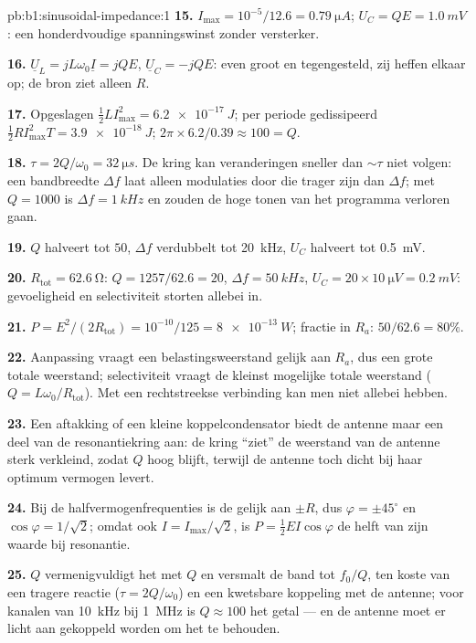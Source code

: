 \begin{solution}{pb:b1:sinusoidal-impedance:1}
\textbf{15.} $I_{\max} = 10^{-5}/12.6 = \qty{0.79}{\micro A}$; $U_C = QE =
\qty{1.0}{mV}$: een honderdvoudige spanningswinst zonder versterker.

\textbf{16.} $\underline U_L = jL\omega_0\underline I = jQE$, $\underline U_C
= -jQE$: even groot en tegengesteld, zij heffen elkaar op; de bron ziet alleen $R$.

\textbf{17.} Opgeslagen $\tfrac12 LI_{\max}^2 = \qty{6.2e-17}{J}$; per periode
gedissipeerd $\tfrac12 RI_{\max}^2T = \qty{3.9e-18}{J}$; $2\pi \times 6.2/0.39
\approx 100 = Q$.

\textbf{18.} $\tau = 2Q/\omega_0 = \qty{32}{\micro s}$. De kring kan
veranderingen sneller dan $\sim\tau$ niet volgen: een bandbreedte $\Delta f$ laat
alleen modulaties door die trager zijn dan $\Delta f$; met $Q = 1000$ is $\Delta f =
\qty{1}{kHz}$ en zouden de hoge tonen van het programma verloren gaan.

\textbf{19.} $Q$ halveert tot $50$, $\Delta f$ verdubbelt tot \qty{20}{kHz}, $U_C$
halveert tot \qty{0.5}{mV}.

\textbf{20.} $R_{\text{tot}} = \qty{62.6}{\ohm}$: $Q = 1257/62.6 = 20$,
$\Delta f = \qty{50}{kHz}$, $U_C = 20 \times \qty{10}{\micro V} = \qty{0.2}{mV}$:
gevoeligheid en selectiviteit storten allebei in.

\textbf{21.} $P = E^2/(2R_{\text{tot}}) = 10^{-10}/125 = \qty{8e-13}{W}$;
fractie in $R_a$: $50/62.6 = 80\%$.

\textbf{22.} Aanpassing vraagt een belastingsweerstand gelijk aan $R_a$, dus een
grote totale weerstand; selectiviteit vraagt de kleinst mogelijke totale
weerstand ($Q = L\omega_0/R_{\text{tot}}$). Met een rechtstreekse verbinding kan
men niet allebei hebben.

\textbf{23.} Een aftakking of een kleine koppelcondensator biedt de antenne
maar een deel van de resonantiekring aan: de kring ``ziet'' de weerstand van de
antenne sterk verkleind, zodat $Q$ hoog blijft, terwijl de
antenne toch dicht bij haar optimum vermogen levert.

\textbf{24.} Bij de halfvermogenfrequenties is de  gelijk aan $\pm R$,
dus $\varphi = \pm45^\circ$ en $\cos\varphi = 1/\sqrt2$; omdat ook $I =
I_{\max}/\sqrt2$, is $P = \tfrac12 EI\cos\varphi$ de helft van zijn waarde bij
resonantie.

\textbf{25.} $Q$ vermenigvuldigt het  met $Q$ en versmalt de band tot
$f_0/Q$, ten koste van een tragere reactie ($\tau = 2Q/\omega_0$) en een
kwetsbare koppeling met de antenne; voor kanalen van \qty{10}{kHz} bij
\qty{1}{MHz} is $Q \approx 100$ het getal --- en de antenne moet er licht
aan gekoppeld worden om het te behouden.
\end{solution}
